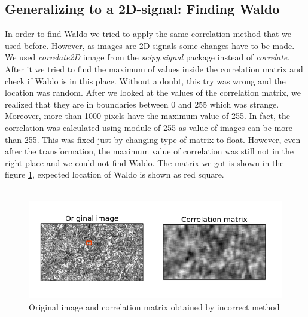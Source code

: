 \documentclass[a4paper]{article}
\begin{document}
    
    \subsection{Generalizing to a 2D-signal: Finding Waldo}
In order to find Waldo we tried to apply the same correlation method that we used before. However, as images are 2D signals some changes have to be made. We used \textit{correlate2D} image from the \textit{scipy.signal} package instead of \textit{correlate}. After it we tried to find the maximum of values inside the correlation matrix and check if Waldo is in this place. Without a doubt, this try was wrong and the location was random. After we looked at the values of the correlation matrix, we realized that they are in boundaries between 0 and 255 which was strange. Moreover, more than 1000 pixels have the maximum value of 255. In fact, the correlation was calculated using module of 255 as value of images can be more than 255. This was fixed just by changing type of matrix to float. However, even after the transformation, the maximum value of correlation was still not in the right place and we could not find Waldo. The matrix we got is shown in the figure \ref{correlate2D_first.png}, expected location of Waldo is shown as red square.\\\\
\begin{figure}[ht!]
	\label{correlate2D_first.png}
	\center
	\includegraphics[width=0.8\linewidth]{img_double_1_edited.png}
	\caption{Original image and correlation matrix obtained by incorrect method}
\end{figure}
\end{document}

